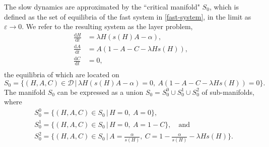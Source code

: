 \documentclass{article}
\theoremstyle{definition}
\numberwithin{equation}{section}
\newcommand{\dd}{\mathrm{d}}
\begin{document}
The slow dynamics are approximated by the ``critical manifold" \cite{MTSD} $S_0$, which is defined as the set of equilibria of the fast system in \eqref{fast-system}, in the limit as $\varepsilon\to0$.
We refer to the resulting system as the layer problem,
\begin{equation}
\begin{split}
    \frac{\dd H}{\dd t} &= \lambda H(s(H) A - \alpha), \\
    \frac{\dd A}{\dd t} &= A(1-A-C-\lambda H s(H)), \\
    \frac{\dd C}{\dd t} &=0,\\
\end{split}
\label{layer-problem}
\end{equation}
the equilibria of which are located on 
\begin{equation}
    S_0 = \{(H,A,C)\in \mathcal{D}\,|\,\lambda H (s(H) A-\alpha)=0,\ A(1-A-C-\lambda H s(H))=0\}.
\end{equation}
The manifold $S_0$ can be expressed as a union $S_0 = S_0^0\cup S_0^1\cup S_0^2$ of sub-manifolds, where
\begin{align}
    &S_0^0 = \big\{(H,A,C)\in S_0\,\big|\, H=0,\ A=0\big\}, \\ 
    &S_0^1 =\big\{(H,A,C)\in S_0\,\big|\, H=0,\ A=1-C\big\},\quad\text{and} \\
    &S_0^2 = \bigg\{(H,A,C)\in S_0\,\bigg|\, A = \frac{\alpha}{s(H)},\ C=1-\frac{\alpha}{s(H)}-\lambda Hs(H)\bigg\}.
    \label{eq: S_0}
\end{align}
\end{document}
